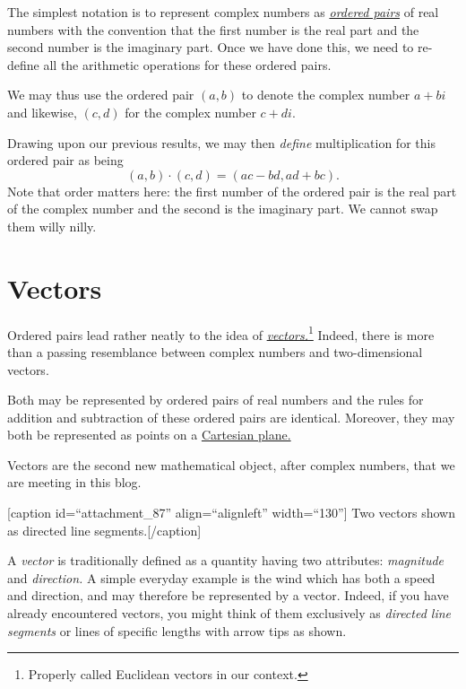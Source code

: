 \documentclass[
  a4paper,
]{article}
\begin{document}
The simplest notation is to represent complex numbers as
\href{http://www.mathsisfun.com/definitions/ordered-pair.html}{\emph{ordered
pairs}} of real numbers with the convention that the first number is the
real part and the second number is the imaginary part. Once we have done
this, we need to re-define all the arithmetic operations for these
ordered pairs.

We may thus use the ordered pair \((a, b)\) to denote the complex number
\(a + bi\) and likewise, \((c, d)\) for the complex number \(c + di\).

Drawing upon our previous results, we may then \emph{define}
multiplication for this ordered pair as being \[
(a, b)\cdot(c, d) = (ac - bd, ad + bc).
\] Note that order matters here: the first number of the ordered pair is
the real part of the complex number and the second is the imaginary
part. We cannot swap them willy nilly.

\hypertarget{vectors}{%
\section{Vectors}\label{vectors}}

Ordered pairs lead rather neatly to the idea of
\href{http://en.wikipedia.org/wiki/Euclidean_vector}{\emph{vectors.}}\footnote{Properly
  called Euclidean vectors in our context.} Indeed, there is more than a
passing resemblance between complex numbers and two-dimensional vectors.

Both may be represented by ordered pairs of real numbers and the rules
for addition and subtraction of these ordered pairs are identical.
Moreover, they may both be represented as points on a
\href{http://en.wikipedia.org/wiki/Cartesian_coordinate_system}{Cartesian
plane.}

Vectors are the second new mathematical object, after complex numbers,
that we are meeting in this blog.

{[}caption id=``attachment\_87'' align=``alignleft'' width=``130''{]}
Two vectors shown as directed line segments.{[}/caption{]}

A \emph{vector} is traditionally defined as a quantity having two
attributes: \emph{magnitude} and \emph{direction.} A simple everyday
example is the wind which has both a speed and direction, and may
therefore be represented by a vector. Indeed, if you have already
encountered vectors, you might think of them exclusively as
\emph{directed line segments} or lines of specific lengths with arrow
tips as shown.
\end{document}
